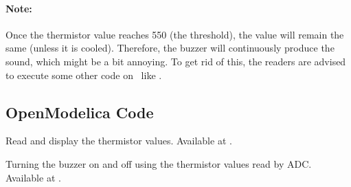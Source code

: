 \begin{enumerate}
        \paragraph{Note:} Once the thermistor value reaches 550 (the threshold), the value will remain the same
        (unless it is cooled). Therefore, the buzzer will continuously produce the sound, which might be
        a bit annoying. To get rid of this, the readers are advised to
        execute some other code on \arduino\ like .

\end{enumerate}

\subsection{OpenModelica Code}
\label{sec:therm-OpenModelica-code}

\begin{OpenModelicacode}
   {Read and display
    the thermistor values.  Available at
    .}
  \label{OpenModelica:therm-read}
  
\end{OpenModelicacode}

\begin{OpenModelicacode}
  {Turning the buzzer on and off using the thermistor values read by
    ADC.  Available at .}
  \label{OpenModelica:therm-buzzer}
  
\end{OpenModelicacode}
